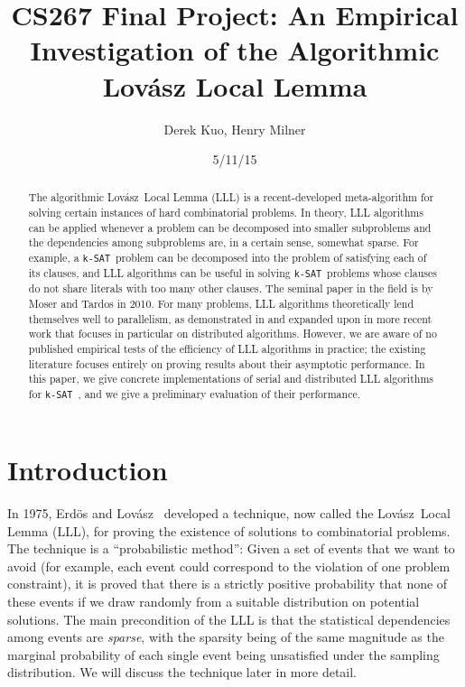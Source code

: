 \documentclass[twocolumn]{article}
\author{Derek Kuo, Henry Milner}
\title{CS267 Final Project: An Empirical Investigation of the Algorithmic Lov\'{a}sz Local Lemma}
\date{5/11/15}
\newcommand{\ksat}{\texttt{k-SAT}~}
\newcommand{\lovasz}{Lov\'{a}sz~}
\begin{document}
\maketitle

\begin{abstract}
The algorithmic \lovasz Local Lemma (LLL) is a recent-developed meta-algorithm for solving certain instances of hard combinatorial problems.  In theory, LLL algorithms can be applied whenever a problem can be decomposed into smaller subproblems and the dependencies among subproblems are, in a certain sense, somewhat sparse.  For example, a \ksat problem can be decomposed into the problem of satisfying each of its clauses, and LLL algorithms can be useful in solving \ksat problems whose clauses do not share literals with too many other clauses.  The seminal paper in the field is by Moser and Tardos \cite{moser2010constructive} in 2010.  For many problems, LLL algorithms theoretically lend themselves well to parallelism, as demonstrated in \cite{moser2010constructive} and expanded upon in more recent work \cite{chung2014distributed,haeupler2011new} that focuses in particular on distributed algorithms.  However, we are aware of no published empirical tests of the efficiency of LLL algorithms in practice; the existing literature focuses entirely on proving results about their asymptotic performance.  In this paper, we give concrete implementations of serial and distributed LLL algorithms for \ksat, and we give a preliminary evaluation of their performance.
\end{abstract}

\section{Introduction}
\label{sec:intro}
In 1975, Erd\"{o}s and \lovasz \cite{erdos1975problems} developed a technique, now called the \lovasz Local Lemma (LLL), for proving the existence of solutions to combinatorial problems.  The technique is a ``probabilistic method'': Given a set of events that we want to avoid (for example, each event could correspond to the violation of one problem constraint), it is proved that there is a strictly positive probability that none of these events if we draw randomly from a suitable distribution on potential solutions.  The main precondition of the LLL is that the statistical dependencies among events are \emph{sparse}, with the sparsity being of the same magnitude as the marginal probability of each single event being unsatisfied under the sampling distribution.  We will discuss the technique later in more detail.
\end{document}
